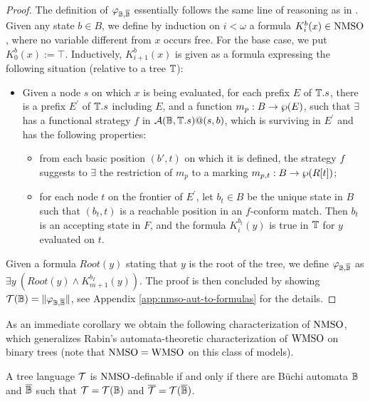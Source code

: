 \begin{proof}
The definition of $\varphi_{\mathbb{B},\overline{\mathbb{B}}}$ essentially follows the
same line of reasoning as in \cite{Rab70}.
Given any state $b \in B$, we define by induction on $i < \omega$ a formula
$K_{i}^{b}(x)\in \mathrm{NMSO}$, where no variable different from $x$ occurs free.
For the base case, we put $K_0^b(x) := \top$. Inductively, $K_{i+1}^{b}(x)$ is
given as a formula expressing the following situation (relative to a tree
$\mathbb{T}$):
\begin{itemize}
\item
Given a node $s$ on which $x$ is being evaluated, for each prefix $E$ of
$\mathbb{T}.s$, there is a prefix $E^{\prime}$ of $\mathbb{T}.s$ including $E$, and a
function $m_p : B\rightarrow \wp (E)$, such that $\exists$ has a functional
strategy $f$ in $\mathcal{A}(\mathbb{B},\mathbb{T}.{s})@(s,b)$, which is surviving in
$E^{\prime}$ and has the following properties:
  \begin{itemize}
    \item from each basic position $(b',t)$ on which it is defined, the
    strategy $f$ suggests to $\exists$ the restriction of $m_p$ to a marking
    $m_{p,t}:B \rightarrow \wp (R[t])$;
    \item for each node $t$ on the frontier of $E^{\prime}$, let $b_t \in B$
    be the unique state in $B$ such that $(b_t,t)$ is a reachable position in
    an $f$-conform match. Then $b_t$ is an accepting state in $F$, and the
    formula $K_i^{b_t}(y)$ is true in $\mathbb{T}$ for $y$ evaluated on $t$.
       \end{itemize}
\end{itemize}

Given a formula $\mathit{Root}(y)$ stating that $y$ is the root of the tree, we
define $\varphi_{\mathbb{B},\overline{\mathbb{B}}}$ as $\exists y\ (\mathit{Root}(y) \wedge
K_{m+1}^{b_I}(y))$. The proof is then concluded by showing $\mathcal{T}(  \mathbb{B}) = \|\varphi_{\mathbb{B},\overline{\mathbb{B}}}\|$, see Appendix \ref{app:nmso-aut-to-formulas} for the details.
\end{proof}
\medskip

As an immediate corollary we obtain the following characterization of
$\mathrm{NMSO}$, which generalizes Rabin's automata-theoretic characterization of
$\mathrm{WMSO}$ on binary trees \cite{Rab70} (note that $\mathrm{NMSO} = \mathrm{WMSO}$ on this class of models).

\begin{corollary}\label{PROP_WFMSO_nondetbuchi}
A tree language $\mathcal{T}$ is $\mathrm{NMSO}$-definable if and only if there are
 B\"{u}chi automata $\mathbb{B}$ and $\overline{\mathbb{B}}$
such that $\mathcal{T} = \mathcal{T}(\mathbb{B})$ and $\overline{\mathcal{T}}
= \mathcal{T}(\overline{\mathbb{B}})$.
\end{corollary}
